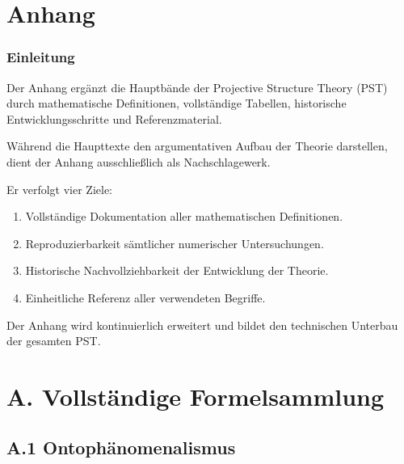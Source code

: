 \appendix

\part*{Anhang}

\section*{Einleitung}

Der Anhang ergänzt die Hauptbände der Projective Structure Theory (PST)
durch mathematische Definitionen, vollständige Tabellen, historische
Entwicklungsschritte und Referenzmaterial.

Während die Haupttexte den argumentativen Aufbau der Theorie darstellen,
dient der Anhang ausschließlich als Nachschlagewerk.

Er verfolgt vier Ziele:

\begin{enumerate}

\item
Vollständige Dokumentation aller mathematischen Definitionen.

\item
Reproduzierbarkeit sämtlicher numerischer Untersuchungen.

\item
Historische Nachvollziehbarkeit der Entwicklung der Theorie.

\item
Einheitliche Referenz aller verwendeten Begriffe.

\end{enumerate}

Der Anhang wird kontinuierlich erweitert und bildet den technischen
Unterbau der gesamten PST.

\vspace{1cm}


\tableofcontents

\newpage

\part{A. Vollständige Formelsammlung}

\chapter{A.1 Ontophänomenalismus}

